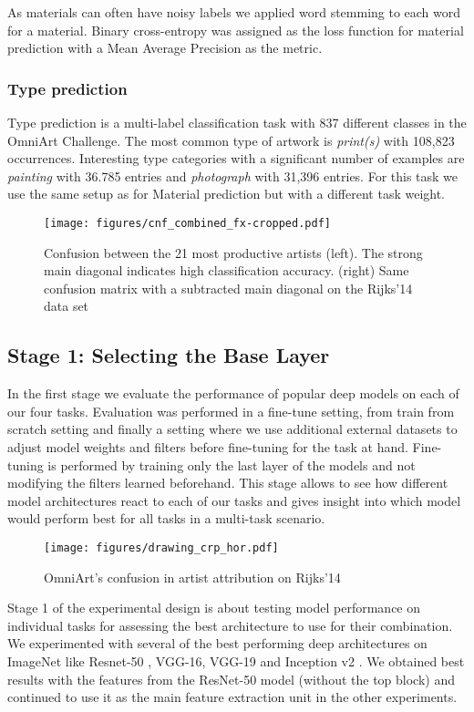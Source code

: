 \documentclass[sigconf]{acmart}
\begin{document}
As materials can often have noisy labels we applied word stemming to each word for a material. Binary cross-entropy was assigned as the loss function for material prediction with a Mean Average Precision as the metric.  

\subsubsection{\textbf{Type prediction}}

Type prediction is a multi-label classification task with 837 different classes in the OmniArt Challenge. The most common type of artwork is \textit{print(s)} with 108,823 occurrences. Interesting type categories with a significant number of examples are \textit{painting} with 36.785 entries and \textit{photograph} with 31,396 entries. For this task we use the same setup as for Material prediction but with a different task weight.

\begin{figure}
  \texttt{[image: figures/cnf\_combined\_fx-cropped.pdf]}
  \caption{Confusion between the 21 most productive artists (left). The strong main diagonal indicates high classification accuracy. (right) Same confusion matrix with a subtracted main diagonal on the Rijks'14 data set  \label{fig:rijksconf}}
\end{figure}\subsection{Stage 1: Selecting the Base Layer}

In the first stage we evaluate the performance of popular deep models on each of our four tasks. Evaluation was performed in a fine-tune setting, from train from scratch setting and finally a setting where we use additional external datasets to adjust model weights and filters before fine-tuning for the task at hand. Fine-tuning is performed by training only the last layer of the models and not modifying the filters learned beforehand. This stage allows to see how different model architectures react to each of our tasks and gives insight into which model would perform best for all tasks in a multi-task scenario.

\begin{figure}
  \texttt{[image: figures/drawing\_crp\_hor.pdf]}
  \caption{OmniArt's confusion in artist attribution on Rijks'14 \label{fig:rijks14_omniart_conf}}
\end{figure}Stage 1 of the experimental design is about testing model performance on individual tasks for assessing the best architecture to use for their combination. We experimented with several of the best performing deep architectures on ImageNet like Resnet-50 \cite{he2016deep}, VGG-16, VGG-19 \cite{DBLP:journals/corr/SimonyanZ14a} and Inception v2 \cite{szegedy2015going}. We obtained best results with the features from the ResNet-50 model (without the top block) and continued to use it as the main feature extraction unit in the other experiments.
\end{document}
